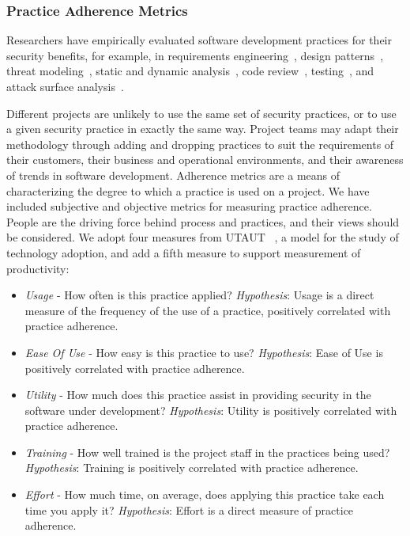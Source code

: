 \subsubsection{Practice Adherence Metrics}
Researchers have empirically evaluated software development practices for their security benefits, for example, in requirements engineering~\cite{riaz2014hidden}, design patterns~\cite{uzunov2015comprehensive}, threat modeling~\cite{shostack2014threat}, static and dynamic analysis~\cite{austin2013comparison}, code review~\cite{meneely2014empirical}, testing~\cite{austin2013comparison}, and attack surface analysis~\cite{theisen2015approximating}.

Different projects are unlikely to use the same set of security practices, or to use a given security practice in exactly the same way. Project teams may adapt their methodology through adding and dropping practices to suit the requirements of their customers, their business and operational environments, and their awareness of trends in software development. Adherence metrics are a means of characterizing the degree to which a practice is used on a project. 
We have included subjective and objective metrics for measuring practice adherence. People are the driving force behind process and practices, and their views should be considered. We adopt four measures from UTAUT ~\cite{venkatesh2003user}, a model for the study of technology adoption, and add a fifth measure to support measurement of productivity: 
\begin{itemize}
\item \textit{Usage} - How often is this practice applied? \textit{Hypothesis}: Usage is a direct measure of the frequency of the use of a practice, positively correlated with practice adherence.
\item \textit{Ease Of Use} - How easy is this practice to use? \textit{Hypothesis}: Ease of Use is positively correlated with practice adherence.
\item \textit{Utility} - How much does this practice assist in providing security in the software under development? \textit{Hypothesis}: Utility is positively correlated with practice adherence.
\item \textit{Training} - How well trained is the project staff in the practices being used? \textit{Hypothesis}: Training is positively correlated with practice adherence.
\item \textit{Effort} - How much time, on average, does applying this practice take each time you apply it? \textit{Hypothesis}: Effort is a direct measure of practice adherence.
\end{itemize}

